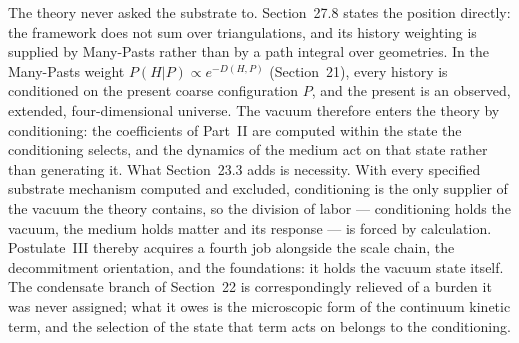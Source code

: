 \documentclass[11pt]{article}
\begin{document}
The theory never asked the substrate to. Section~27.8 states the position directly: the framework does not sum over triangulations, and its history weighting is supplied by Many-Pasts rather than by a path integral over geometries. In the Many-Pasts weight $P(H|P)\propto e^{-D(H,P)}$ (Section~21), every history is conditioned on the present coarse configuration $P$, and the present is an observed, extended, four-dimensional universe. The vacuum therefore enters the theory by conditioning: the coefficients of Part~II are computed within the state the conditioning selects, and the dynamics of the medium act on that state rather than generating it. What Section~23.3 adds is necessity. With every specified substrate mechanism computed and excluded, conditioning is the only supplier of the vacuum the theory contains, so the division of labor --- conditioning holds the vacuum, the medium holds matter and its response --- is forced by calculation. Postulate~III thereby acquires a fourth job alongside the scale chain, the decommitment orientation, and the foundations: it holds the vacuum state itself. The condensate branch of Section~22 is correspondingly relieved of a burden it was never assigned; what it owes is the microscopic form of the continuum kinetic term, and the selection of the state that term acts on belongs to the conditioning.
\end{document}
